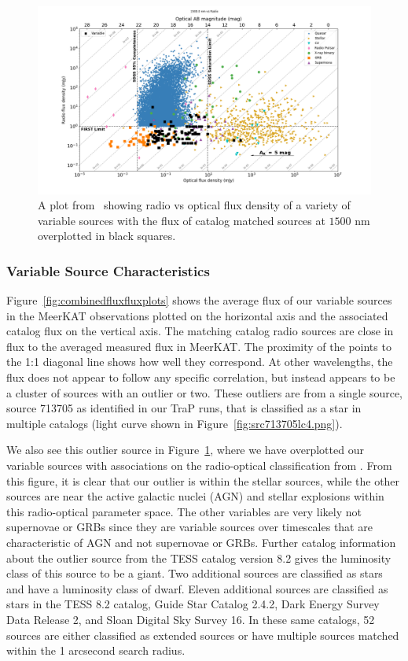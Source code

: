 \documentclass[12pt]{article}
\begin{document}
\begin{figure}
	\includegraphics[width=\textwidth]{radio_opt_1500.0.png}
	\caption{A plot from~\citet{2018MNRAS.479.2481S} showing radio vs optical flux density of a variety of variable sources with the flux of catalog matched sources at $1500$ nm overplotted in black squares.}
	\label{fig:stewartetalplot}
\end{figure}


\subsubsection{Variable Source Characteristics}
Figure~\ref{fig:combinedfluxfluxplots} shows the average flux of our variable sources in the MeerKAT observations plotted on the horizontal axis and the associated catalog flux on the vertical axis. The matching catalog radio sources are close in flux to the averaged measured flux in MeerKAT. The proximity of the points to the 1:1 diagonal line shows how well they correspond. At other wavelengths, the flux does not appear to follow any specific correlation, but instead appears to be a cluster of sources with an outlier or two. These outliers are from a single source, source 713705 as identified in our TraP runs, that is classified as a star in multiple catalogs (light curve shown in Figure~\ref{fig:src713705lc4.png}). 

We also see this outlier source in Figure~\ref{fig:stewartetalplot}, where we have overplotted our variable sources with associations on the radio-optical classification from \citet{2018MNRAS.479.2481S}. From this figure, it is clear that our outlier is within the stellar sources, while the other sources are near the active galactic nuclei (AGN) and stellar explosions within this radio-optical parameter space. The other variables are very likely not supernovae or GRBs since they are variable sources over timescales that are characteristic of AGN and not supernovae or GRBs. Further catalog information about the outlier source from the TESS catalog version 8.2 gives the luminosity class of this source to be a giant. Two additional sources are classified as stars and have a luminosity class of dwarf. Eleven additional sources are classified as stars in the TESS 8.2 catalog, Guide Star Catalog 2.4.2, Dark Energy Survey Data Release 2, and Sloan Digital Sky Survey 16. In these same catalogs, 52 sources are either classified as extended sources or have multiple sources matched within the 1 arcsecond search radius. 
\end{document}
